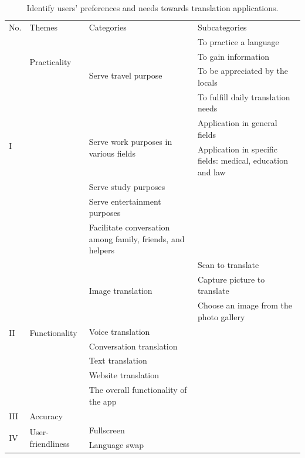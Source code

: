 \documentclass[english]{textolivre}
\begin{document}
\begin{longtable}{p{1cm} p{2.5cm} p{4.5cm} p{5cm}}
\caption{Identify users’ preferences and needs towards translation applications.}
\label{tbl1}
\footnotesize
\\
\toprule
No. & Themes & Categories & Subcategories \\ 
\midrule
\multirow{9}{=}{I} & \multirow{3}{=}{Practicality} & \multirow{4}{=}{Serve travel purpose} & To practice a language \\
& & & To gain information \\
& & & To be appreciated by the locals \\
& & & To fulfill daily translation needs \\
\cmidrule{3-4}
& & \multirow{2}{=}{Serve work purposes in various fields} & Application in general fields \\
& & & Application in specific fields: medical, education and law \\
\cmidrule{3-4}
& & Serve study purposes & \cellcolor[HTML]{EFEFEF} \\
&  & Serve entertainment purposes & \cellcolor[HTML]{EFEFEF} \\
& & Facilitate conversation among family, friends, and helpers & \cellcolor[HTML]{EFEFEF} \\
\midrule
\multirow{8}{=}{II} & \multirow{8}{=}{Functionality} & \multirow{3}{=}{Image translation} & Scan to translate \\
& & & Capture picture to translate \\
& & & Choose an image from the photo gallery \\
\cmidrule{3-4}
& & Voice translation & \cellcolor[HTML]{EFEFEF} \\
\cmidrule{3-4}
& & Conversation translation & \cellcolor[HTML]{EFEFEF} \\
\cmidrule{3-4}
& & Text translation & \cellcolor[HTML]{EFEFEF} \\
\cmidrule{3-4}
& & Website translation & \cellcolor[HTML]{EFEFEF} \\
\cmidrule{3-4}
& & The overall functionality of the app & \cellcolor[HTML]{EFEFEF} \\
\midrule
III & Accuracy & \cellcolor[HTML]{EFEFEF} & \cellcolor[HTML]{EFEFEF} \\
\midrule
\multirow{5}{=}{IV} & \multirow{5}{=}{User-friendliness} & Fullscreen & \cellcolor[HTML]{EFEFEF} \\
\cmidrule{3-4}
& & Language swap & \cellcolor[HTML]{EFEFEF} \\

\end{longtable}
\end{document}
